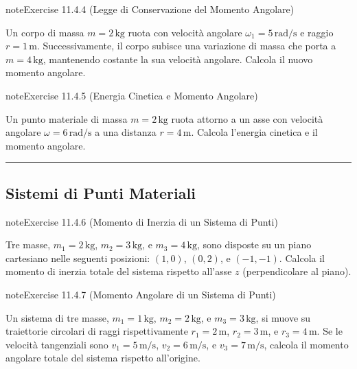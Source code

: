 \documentclass[letterpaper,10pt,italian]{jupyterBook}
\begin{document}
\begin{sphinxadmonition}{note}{Exercise 11.4.4 (Legge di Conservazione del Momento Angolare)}



\sphinxAtStartPar
Un corpo di massa \(m = 2 \, \text{kg}\) ruota con velocità angolare \(\omega_1 = 5 \, \text{rad/s}\) e raggio \(r = 1 \, \text{m}\). Successivamente, il corpo subisce una variazione di massa che porta a \(m = 4 \, \text{kg}\), mantenendo costante la sua velocità angolare. Calcola il nuovo momento angolare.
\end{sphinxadmonition}
 \label{exercise:ch/mechanics/inertia-problems-exercise-4}

\begin{sphinxadmonition}{note}{Exercise 11.4.5 (Energia Cinetica e Momento Angolare)}



\sphinxAtStartPar
Un punto materiale di massa \(m = 2 \, \text{kg}\) ruota attorno a un asse con velocità angolare \(\omega = 6 \, \text{rad/s}\) a una distanza \(r = 4 \, \text{m}\). Calcola l’energia cinetica e il momento angolare.
\end{sphinxadmonition}


\bigskip\hrule\bigskip



\subsection{Sistemi di Punti Materiali}
\label{\detokenize{ch/mechanics/inertia-problems:sistemi-di-punti-materiali}} \label{exercise:ch/mechanics/inertia-problems-exercise-5}

\begin{sphinxadmonition}{note}{Exercise 11.4.6 (Momento di Inerzia di un Sistema di Punti)}



\sphinxAtStartPar
Tre masse, \(m_1 = 2 \, \text{kg}\), \(m_2 = 3 \, \text{kg}\), e \(m_3 = 4 \, \text{kg}\), sono disposte su un piano cartesiano nelle seguenti posizioni: \((1, 0)\), \((0, 2)\), e \((-1, -1)\). Calcola il momento di inerzia totale del sistema rispetto all’asse \(z\) (perpendicolare al piano).
\end{sphinxadmonition}
 \label{exercise:ch/mechanics/inertia-problems-exercise-6}

\begin{sphinxadmonition}{note}{Exercise 11.4.7 (Momento Angolare di un Sistema di Punti)}



\sphinxAtStartPar
Un sistema di tre masse, \(m_1 = 1 \, \text{kg}\), \(m_2 = 2 \, \text{kg}\), e \(m_3 = 3 \, \text{kg}\), si muove su traiettorie circolari di raggi rispettivamente \(r_1 = 2 \, \text{m}\), \(r_2 = 3 \, \text{m}\), e \(r_3 = 4 \, \text{m}\). Se le velocità tangenziali sono \(v_1 = 5 \, \text{m/s}\), \(v_2 = 6 \, \text{m/s}\), e \(v_3 = 7 \, \text{m/s}\), calcola il momento angolare totale del sistema rispetto all’origine.
\end{sphinxadmonition}
 \label{exercise:ch/mechanics/inertia-problems-exercise-7}
\end{document}
